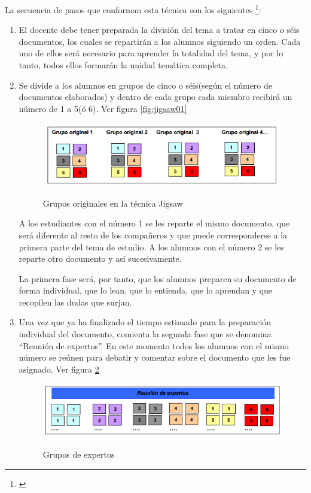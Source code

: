 La secuencia de pasos que conforman esta técnica son los siguientes \footnote{\cite{upm_2008}}:

\begin{enumerate}
  \item El docente debe tener preparada la división del tema a tratar en cinco o séis documentos, los cuales se repartirán a los alumnos siguiendo un orden. Cada uno de ellos será necesario para aprender la totalidad del tema, y por lo tanto, todos ellos formarán la unidad temática completa.
  \item Se divide a los alumnos en grupos de cinco o séis(según el número de documentos elaborados) y dentro de cada grupo cada miembro recibirá un número de 1 a 5(ó 6). Ver figura \ref{fig:jigsaw01}
      
\begin{figure}[h]
  \centering
  \includegraphics[scale=0.6]{figuras/jigsaw01.png}\\
  \caption{Grupos originales en la técnica Jigsaw}\label{fid:jigsaw01}
\end{figure}

A los estudiantes con el número 1 se les reparte el mismo documento, que será diferente al resto de los compañeros y que puede corresponderse a la primera parte del tema de estudio. A los alumnos con el número 2 se les reparte otro documento y así sucesivamente.

La primera fase será, por tanto, que los alumnos preparen su documento de forma individual, que lo lean, que lo entienda, que lo aprendan y que recopilen las dudas que surjan.

  \item Una vez que ya ha finalizado el tiempo estimado para la preparación individual del documento, comienta la segunda fase que se denomina ``Reunión de expertos''. En este momento todos los alumnos con el mismo número se reúnen para debatir y comentar sobre el documento que les fue asignado. Ver figura \ref{fig:jigsaw02}
  
  \begin{figure}[h]
  \centering
  \includegraphics[scale=0.6]{figuras/jigsaw02.png}\\
  \caption{Grupos de expertos}\label{fig:jigsaw02}
\end{figure}    


\end{enumerate}
